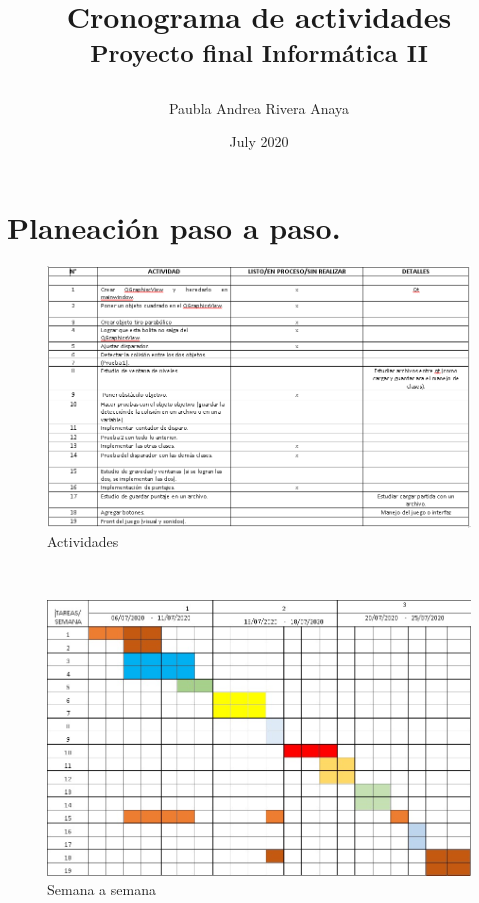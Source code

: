 \documentclass{article}
\title{Cronograma de actividades
\\
{\footnotesize\textsuperscript{Proyecto final Informática II}
}
}
\author{Paubla Andrea Rivera Anaya}
\date{July 2020}
\begin{document}
\maketitle

\section{Planeación paso a paso.}


\begin{figure}[h!]
\centering
\includegraphics[width=1.1\textwidth]{Fechas2.PNG}
\caption{\label{fig1}Actividades}
\end{figure}
\\

\begin{figure}[h!]
\centering
\includegraphics[width=1.1\textwidth]{prueba.png}
\caption{\label{fig1}Semana a semana}
\end{figure}
\\
\end{document}

